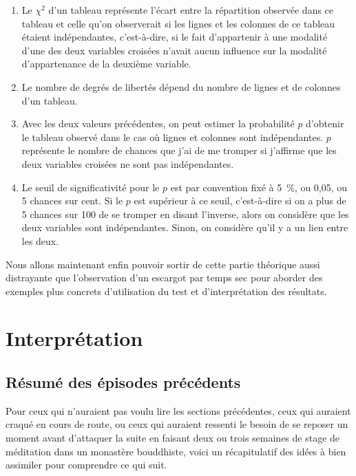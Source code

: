 \documentclass[a4paper,10pt,twoside,francais]{report}
\newcommand{\chid}{$\chi^2$\xspace}
\begin{document}
\begin{enumerate}
\item Le \chid d'un tableau représente l'écart entre la répartition
  observée dans ce tableau et celle qu'on observerait si les lignes et
  les colonnes de ce tableau étaient indépendantes, c'est-à-dire, si
  le fait d'appartenir à une modalité d'une des deux variables
  croisées n'avait aucun influence sur la modalité d'appartenance de
  la deuxième variable.
\item Le nombre de degrés de libertés dépend du nombre de lignes et de
  colonnes d'un tableau.
\item Avec les deux valeurs précédentes, on peut estimer la
  probabilité $p$ d'obtenir le tableau observé dans le cas où lignes
  et colonnes sont indépendantes. $p$ représente le nombre de chances
  que j'ai de me tromper si j'affirme que les deux variables croisées
  ne sont pas indépendantes.
\item Le seuil de significativité pour le $p$ est par convention fixé
  à 5~\%, ou 0,05, ou 5 chances sur cent. Si le $p$ est supérieur à ce
  seuil, c'est-à-dire si on a plus de 5 chances sur 100 de se tromper
  en disant l'inverse, alors on considère que les deux variables sont
  indépendantes. Sinon, on considère qu'il y a un lien entre les deux.
\end{enumerate}

Nous allons maintenant enfin pouvoir sortir de cette partie théorique
aussi distrayante que l'observation d'un escargot par temps sec pour
aborder des exemples plus concrets d'utilisation du test et
d'interprétation des résultats.



\chapter{Interprétation}
\label{sec-interp}


\section{Résumé des épisodes précédents}

Pour ceux qui n'auraient pas voulu lire les sections précédentes, ceux
qui auraient craqué en cours de route, ou ceux qui auraient ressenti
le besoin de se reposer un moment avant d'attaquer la suite en faisant
deux ou trois semaines de stage de méditation dans un monastère
bouddhiste, voici un récapitulatif des idées à bien assimiler pour
comprendre ce qui suit.
\end{document}
